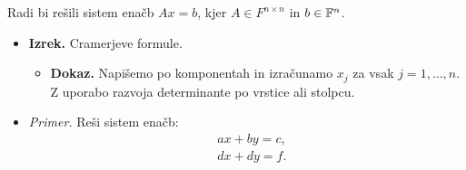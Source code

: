\begin{enumerate}
    Radi bi rešili sistem enačb $Ax=b$, kjer $A \in F^{n \times n}$ in $b \in \mathbb{F}^n$.
    \begin{itemize}
        \item \colorbox{blue!30}{\textbf{Izrek.}} Cramerjeve formule.
        \begin{itemize}
            \item \colorbox{green!30}{\textbf{Dokaz.}} Napišemo po komponentah in izračunamo $x_j$ za vsak $j = 1, \ldots, n$. Z uporabo razvoja determinante po vrstice ali stolpcu.
        \end{itemize}
        \item\colorbox{yellow!30}{\emph{Primer.}} Reši sistem enačb:
        \begin{align*}
            &ax+by = c, \\
            &dx+dy = f.
        \end{align*}
    \end{itemize}  
\end{enumerate}

\newpage
\